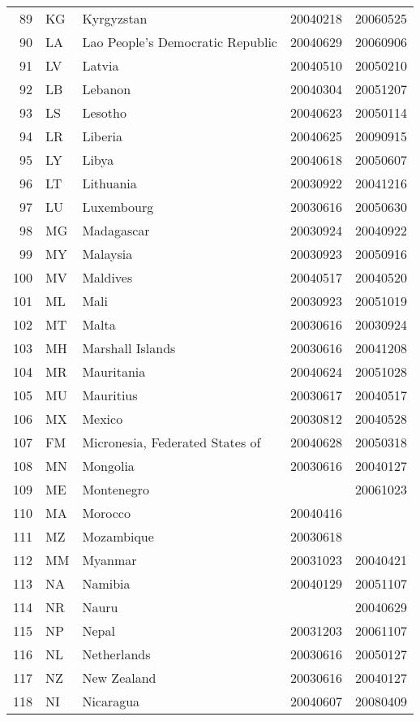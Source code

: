 \begin{longtable}{rllrr}
  89 & KG & Kyrgyzstan & 20040218 & 20060525 \\ 
  90 & LA & Lao People's Democratic Republic & 20040629 & 20060906 \\ 
  91 & LV & Latvia & 20040510 & 20050210 \\ 
  92 & LB & Lebanon & 20040304 & 20051207 \\ 
  93 & LS & Lesotho & 20040623 & 20050114 \\ 
  94 & LR & Liberia & 20040625 & 20090915 \\ 
  95 & LY & Libya & 20040618 & 20050607 \\ 
  96 & LT & Lithuania & 20030922 & 20041216 \\ 
  97 & LU & Luxembourg & 20030616 & 20050630 \\ 
  98 & MG & Madagascar & 20030924 & 20040922 \\ 
  99 & MY & Malaysia & 20030923 & 20050916 \\ 
  100 & MV & Maldives & 20040517 & 20040520 \\ 
  101 & ML & Mali & 20030923 & 20051019 \\ 
  102 & MT & Malta & 20030616 & 20030924 \\ 
  103 & MH & Marshall Islands & 20030616 & 20041208 \\ 
  104 & MR & Mauritania & 20040624 & 20051028 \\ 
  105 & MU & Mauritius & 20030617 & 20040517 \\ 
  106 & MX & Mexico & 20030812 & 20040528 \\ 
  107 & FM & Micronesia, Federated States of & 20040628 & 20050318 \\ 
  108 & MN & Mongolia & 20030616 & 20040127 \\ 
  109 & ME & Montenegro &  & 20061023 \\ 
  110 & MA & Morocco & 20040416 &  \\ 
  111 & MZ & Mozambique & 20030618 &  \\ 
  112 & MM & Myanmar & 20031023 & 20040421 \\ 
  113 & NA & Namibia & 20040129 & 20051107 \\ 
  114 & NR & Nauru &  & 20040629 \\ 
  115 & NP & Nepal & 20031203 & 20061107 \\ 
  116 & NL & Netherlands & 20030616 & 20050127 \\ 
  117 & NZ & New Zealand & 20030616 & 20040127 \\ 
  118 & NI & Nicaragua & 20040607 & 20080409 \\ 

\end{longtable}
